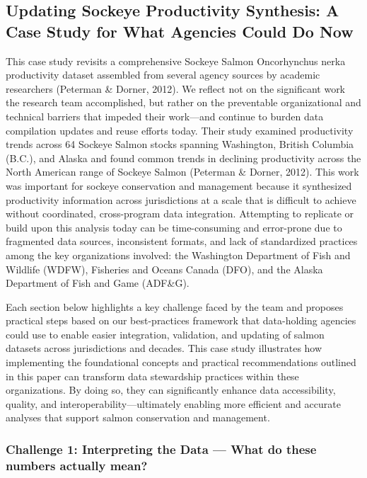 \documentclass[
  letterpaper,
  DIV=11,
  numbers=noendperiod]{scrartcl}
\begin{document}
\subsection{Updating Sockeye Productivity Synthesis: A Case Study for
What Agencies Could Do
Now}\label{updating-sockeye-productivity-synthesis-a-case-study-for-what-agencies-could-do-now}

This case study revisits a comprehensive Sockeye Salmon Oncorhynchus
nerka productivity dataset assembled from several agency sources by
academic researchers (Peterman \& Dorner, 2012). We reflect not on the
significant work the research team accomplished, but rather on the
preventable organizational and technical barriers that impeded their
work---and continue to burden data compilation updates and reuse efforts
today. Their study examined productivity trends across 64 Sockeye Salmon
stocks spanning Washington, British Columbia (B.C.), and Alaska and
found common trends in declining productivity across the North American
range of Sockeye Salmon (Peterman \& Dorner, 2012). This work was
important for sockeye conservation and management because it synthesized
productivity information across jurisdictions at a scale that is
difficult to achieve without coordinated, cross-program data
integration. Attempting to replicate or build upon this analysis today
can be time-consuming and error-prone due to fragmented data sources,
inconsistent formats, and lack of standardized practices among the key
organizations involved: the Washington Department of Fish and Wildlife
(WDFW), Fisheries and Oceans Canada (DFO), and the Alaska Department of
Fish and Game (ADF\&G).

Each section below highlights a key challenge faced by the team and
proposes practical steps based on our best-practices framework that
data-holding agencies could use to enable easier integration,
validation, and updating of salmon datasets across jurisdictions and
decades. This case study illustrates how implementing the foundational
concepts and practical recommendations outlined in this paper can
transform data stewardship practices within these organizations. By
doing so, they can significantly enhance data accessibility, quality,
and interoperability---ultimately enabling more efficient and accurate
analyses that support salmon conservation and management.

\subsubsection{Challenge 1: Interpreting the Data --- What do these
numbers actually
mean?}\label{challenge-1-interpreting-the-data-what-do-these-numbers-actually-mean}
\end{document}
